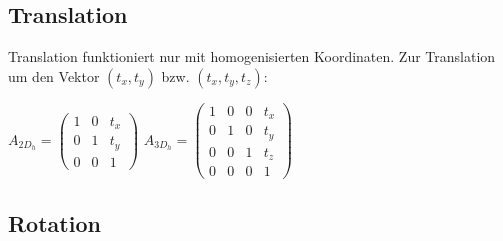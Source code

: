 \documentclass[10pt,a4paper]{article}
\begin{document}
	\newpage
	\subsection{Translation}
	\label{tf:sub:translation}
	
	Translation funktioniert nur mit homogenisierten Koordinaten. Zur Translation um den Vektor $(t_x, t_y)$ bzw. $(t_x, t_y, t_z):$
	\begin{center}
		$A_{2D_h} = \begin{pmatrix} 1 & 0 & t_x\\0 & 1 & t_y \\ 0 & 0 & 1\end{pmatrix}$\hspace*{1cm}
		$A_{3D_h} = \begin{pmatrix} 1 & 0 & 0 & t_x\\0 & 1 & 0 & t_y\\0 & 0 & 1 & t_z \\ 0 & 0 & 0 & 1\end{pmatrix}$
	\end{center}

	\subsection{Rotation}
	\label{tf:sub:rotation}
	
\end{document}
